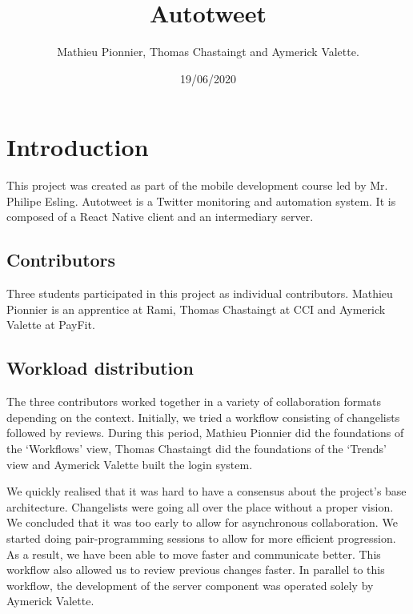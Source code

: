 \documentclass{report}
\begin{document}
\title{Autotweet}
\author{Mathieu Pionnier, Thomas Chastaingt and Aymerick Valette.}
\date{19/06/2020}

\maketitle

\tableofcontents{}

\clearpage

\chapter{Introduction}

This project was created as part of the mobile development course led by Mr. Philipe Esling. Autotweet is a Twitter monitoring and automation system. It is composed of a React Native client and an intermediary server.

\section{Contributors}
Three students participated in this project as individual contributors. Mathieu Pionnier is an apprentice at Rami, Thomas Chastaingt at CCI and Aymerick Valette at PayFit. 

\section{Workload distribution}
The three contributors worked together in a variety of collaboration formats depending on the context. Initially, we tried a workflow consisting of changelists followed by reviews. During this period, Mathieu Pionnier did the foundations of the `Workflows' view, Thomas Chastaingt did the foundations of the `Trends' view and Aymerick Valette built the login system. 

We quickly realised that it was hard to have a consensus about the project’s base architecture. Changelists were going all over the place without a proper vision. We concluded that it was too early to allow for asynchronous collaboration. We started doing pair-programming sessions to allow for more efficient progression. As a result, we have been able to move faster and communicate better. This workflow also allowed us to review previous changes faster. In parallel to this workflow, the development of the server component was operated solely by Aymerick Valette.

\clearpage
\end{document}
